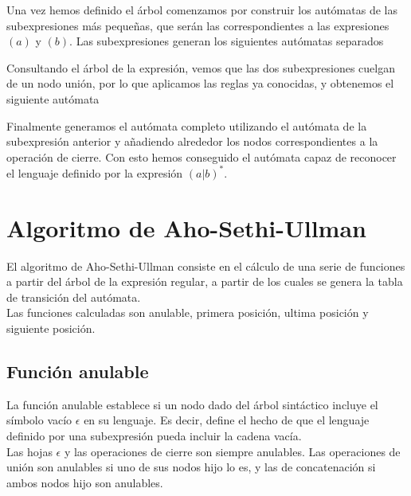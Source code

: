 
Una vez hemos definido el árbol comenzamos por construir los autómatas de las subexpresiones más pequeñas, que serán las correspondientes a las expresiones $(a)$ y $(b)$.
Las subexpresiones generan los siguientes autómatas separados


Consultando el árbol de la expresión, vemos que las dos subexpresiones cuelgan de un nodo unión, por lo que aplicamos las reglas ya conocidas, y obtenemos el siguiente autómata


Finalmente generamos el autómata completo utilizando el autómata de la subexpresión anterior y añadiendo alrededor los nodos correspondientes a la operación de cierre.
Con esto hemos conseguido el autómata capaz de reconocer el lenguaje definido por la expresión $(a|b)^*$.


\section{Algoritmo de Aho-Sethi-Ullman}
El algoritmo de Aho-Sethi-Ullman \cite{dragon} \cite{5221603} consiste en el cálculo de una serie de funciones a partir del árbol de la expresión regular, a partir de los cuales se genera la tabla de transición del autómata.
\\
Las funciones calculadas son anulable, primera posición, ultima posición y siguiente posición.

\subsection{Función anulable}
La función anulable establece si un nodo dado del árbol sintáctico incluye el símbolo vacío $ \epsilon $ en su lenguaje.
Es decir, define el hecho de que el lenguaje definido por una subexpresión pueda incluir la cadena vacía.
\\
Las hojas $ \epsilon $ y las operaciones de cierre son siempre anulables.
Las operaciones de unión son anulables si uno de sus nodos hijo lo es, y las de concatenación si ambos nodos hijo son anulables.

